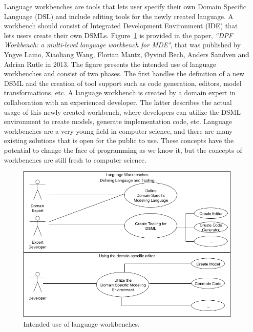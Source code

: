 Language workbenches are tools that lets user specify
their own Domain Specific Language (DSL) and include editing tools for the newly
created language. A workbench should consist of Integrated Development
Environment (IDE) that lets users create their own DSMLs.
Figure~\ref{fig:langauge_workbench} is provided in the paper, \textit{``DPF
Workbench: a multi-level language workbench for MDE"}, that was published by
Yngve Lamo, Xiaoliang Wang, Florian Mantz, {\O}yvind Bech, Anders Sandven and
Adrian Rutle in 2013. The figure presents the intended use of language
workbenches and consist of two phases. The first handles the definition of a
new DSML and the creation of tool support such as code generation, editors,
model transformations, etc. A language workbench is created by a domain expert
in collaboration with an experienced developer. The latter describes the actual
usage of this newly created workbench, where developers can utilize the DSML
environment to create models, generate implementation code, etc. Language
workbenches are a very young field in computer science, and there are many
existing solutions that is open for the public to use. These concepts have the
potential to change the face of programming as we know
it\cite{fowler2010domain}, but the concepts of workbenches are still fresh to
computer science.

\begin{figure}[H]
	\centering
	\includegraphics[scale=0.6]{./Figures/langauge_workbehcn.png}
	\caption[Intended use of language workbenches]
	{Intended use of language workbenches.}
	\label{fig:langauge_workbench}
\end{figure}

